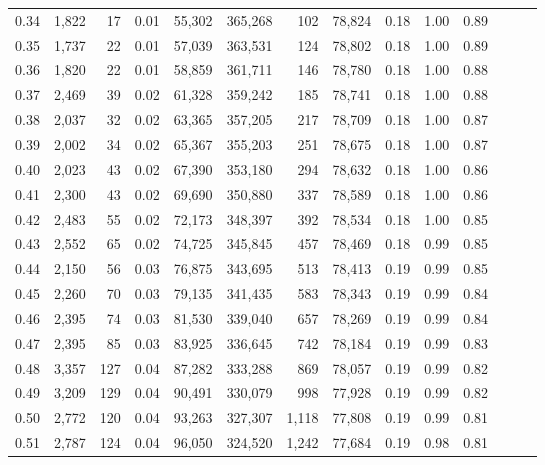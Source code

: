 \begin{tabular}{rrrrrrrrrrrrrr}
0.34 &   1,822 &     17 &  0.01 &   55,302 &  365,268 &     102 &  78,824 &  0.18 &  1.00 &      0.89 \\
0.35 &   1,737 &     22 &  0.01 &   57,039 &  363,531 &     124 &  78,802 &  0.18 &  1.00 &      0.89 \\
0.36 &   1,820 &     22 &  0.01 &   58,859 &  361,711 &     146 &  78,780 &  0.18 &  1.00 &      0.88 \\
0.37 &   2,469 &     39 &  0.02 &   61,328 &  359,242 &     185 &  78,741 &  0.18 &  1.00 &      0.88 \\
0.38 &   2,037 &     32 &  0.02 &   63,365 &  357,205 &     217 &  78,709 &  0.18 &  1.00 &      0.87 \\
0.39 &   2,002 &     34 &  0.02 &   65,367 &  355,203 &     251 &  78,675 &  0.18 &  1.00 &      0.87 \\
0.40 &   2,023 &     43 &  0.02 &   67,390 &  353,180 &     294 &  78,632 &  0.18 &  1.00 &      0.86 \\
0.41 &   2,300 &     43 &  0.02 &   69,690 &  350,880 &     337 &  78,589 &  0.18 &  1.00 &      0.86 \\
0.42 &   2,483 &     55 &  0.02 &   72,173 &  348,397 &     392 &  78,534 &  0.18 &  1.00 &      0.85 \\
0.43 &   2,552 &     65 &  0.02 &   74,725 &  345,845 &     457 &  78,469 &  0.18 &  0.99 &      0.85 \\
0.44 &   2,150 &     56 &  0.03 &   76,875 &  343,695 &     513 &  78,413 &  0.19 &  0.99 &      0.85 \\
0.45 &   2,260 &     70 &  0.03 &   79,135 &  341,435 &     583 &  78,343 &  0.19 &  0.99 &      0.84 \\
0.46 &   2,395 &     74 &  0.03 &   81,530 &  339,040 &     657 &  78,269 &  0.19 &  0.99 &      0.84 \\
0.47 &   2,395 &     85 &  0.03 &   83,925 &  336,645 &     742 &  78,184 &  0.19 &  0.99 &      0.83 \\
0.48 &   3,357 &    127 &  0.04 &   87,282 &  333,288 &     869 &  78,057 &  0.19 &  0.99 &      0.82 \\
0.49 &   3,209 &    129 &  0.04 &   90,491 &  330,079 &     998 &  77,928 &  0.19 &  0.99 &      0.82 \\
0.50 &   2,772 &    120 &  0.04 &   93,263 &  327,307 &   1,118 &  77,808 &  0.19 &  0.99 &      0.81 \\
0.51 &   2,787 &    124 &  0.04 &   96,050 &  324,520 &   1,242 &  77,684 &  0.19 &  0.98 &      0.81 \\

\end{tabular}
